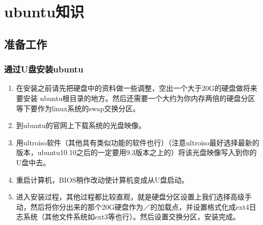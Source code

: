 \part{ubuntu知识}
\chapter{准备工作}
\section{通过U盘安装ubuntu}
\begin{enumerate}
\item  在安装之前请先把硬盘中的资料做一些调整，空出一个大于20G的硬盘做将来要安装 ubuntu根目录的地方。然后还需要一个大约为你内存两倍的硬盘分区等下要作为linux系统的swap交换分区。
\item 到ubuntu的官网上下载系统的光盘映像。
\item 用ultroiso软件（其他具有类似功能的软件也行）（注意ultroiso最好选择最新的版本，ubuntu10.10之后的一定要用9.3版本之上的）将该光盘映像写入到你的U盘中去。
\item 重启计算机，BIOS稍作改动使计算机变成从U盘启动。
\item 进入安装过程，其他过程都比较直观，就是硬盘分区设置上我们选择高级手动，然后将你分出来的那个20G硬盘作为／的加载点，并设置格式化成ext4日志系统（其他文件系统如ext3等也行）。然后设置交换分区，安装完成。
\end{enumerate}


